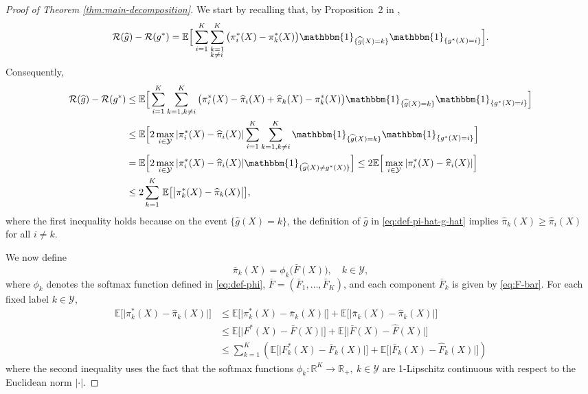 \documentclass{article}
\theoremstyle{plain}
\theoremstyle{definition}
\theoremstyle{remark}
\newcommand{\EE}{\mathbb{E}}
\newcommand{\calY}{\mathcal{Y}}
\newcommand{\calR}{\mathcal{R}}
\begin{document}
\begin{proof}[Proof of Theorem \ref{thm:main-decomposition}]
We start by recalling that, by Proposition~2 in \citet{Denis2020},
\begin{align}
\calR(\widehat{g})-\mathcal{R}(g^*)=\EE \Big[ \sum_{i=1}^K\sum_{\substack{k=1\\ k\neq i\,}}^K \big( \pi_i^*(X)-\pi_k^*(X)\big)\mathbbm{1}_{\{\widehat g(X)=k\}}\mathbbm{1}_{\{g^*(X)=i\}}\Big].
\end{align}
Consequently,
\begin{align}
\calR(\widehat{g})-\mathcal{R}(g^*)&\leq \EE \Big[ \sum_{i=1}^K\sum_{k=1, k\neq i}^K \big( \pi_i^*(X)-\widehat \pi_i(X) + \widehat \pi_k(X)-\pi_k^*(X)\big)\mathbbm{1}_{\{\widehat g(X)=k\}}\mathbbm{1}_{\{g^*(X)=i\}}\Big]\nonumber\\
&\leq \EE \Big[ 2 \max_{i\in\mathcal{Y}}| \pi_i^*(X)-\widehat \pi_i(X)|  \sum_{i=1}^K\sum_{k=1, k\neq i}^K \mathbbm{1}_{\{\widehat g(X)=k\}}\mathbbm{1}_{\{g^*(X)=i\}} \Big]\nonumber\\
&=\EE \Big[ 2 \max_{i\in\mathcal{Y}}| \pi_i^*(X)-\widehat \pi_i(X)|  \mathbbm{1}_{\{\widehat g(X)\neq g^*(X)\}}\Big]\leq 2\EE \Big[  \max_{i\in\mathcal{Y}}| \pi_i^*(X)-\widehat \pi_i(X)| \Big]\nonumber\\
&\leq 2 \sum_{k=1}^{K}\,\EE \big[ \big|\pi_k^*(X)-\widehat \pi_k(X) \big|\big],\nonumber
\end{align}
where the first inequality holds because on the event 
\( \{\widehat g(X)=k\} \), the definition of \( \widehat g \) in
\eqref{eq:def-pi-hat-g-hat} implies \( \widehat \pi_k(X) \ge \widehat \pi_i(X) \) for all $i\neq k$.


We now define
\[\bar\pi_k(X) = \phi_k\big( \bar{F}(X) \big),\quad  k\in \calY,\]
where \( \phi_k \) denotes the softmax function defined in
\eqref{eq:def-phi}, \( \bar F = (\bar F_1,\ldots,\bar F_K) \), and each component
\( \bar F_k \) is given by \eqref{eq:F-bar}.
For each fixed label \( k \in \mathcal Y \), %
\begin{align}\label{eq:ineq-pi-and-F}
    \EE \big[ \big|\pi_k^*(X)-\widehat \pi_k(X) \big|\big]&\leq \EE \big[ \big|\pi_k^*(X)-\bar \pi_k(X) \big|\big]+\EE \big[ \big|\bar\pi_k(X)-\widehat \pi_k(X) \big|\big]\nonumber\\
    &\leq \EE \big[ \big|F^*(X)-\bar F(X) \big|\big]+\EE \big[ \big|\bar F(X)-\widehat F(X) \big|\big]\nonumber\\
    &\leq \sum_{k=1}^K \left(\EE \big[ \big|F_k^*(X)-\bar F_k(X) \big|\big]+\EE \big[ \big|\bar F_k(X)-\widehat F_k(X) \big|\big]\right)
\end{align}
where the second inequality uses the fact that the softmax functions
\( \phi_k : \mathbb R^K \to \mathbb R_+, \:k\in \calY\) are 1-Lipschitz continuous with respect to the Euclidean norm \( |\cdot| \).


\end{proof}
\end{document}

